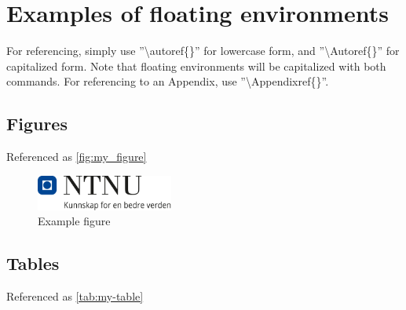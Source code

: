 
\section{Examples of floating environments}
\label{appendix:floats}

For referencing, simply use ''\textbackslash autoref\{\}'' for lowercase form, and ''\textbackslash Autoref\{\}'' for capitalized form. Note that floating environments will be capitalized with both commands.
For referencing to an Appendix, use ''\textbackslash Appendixref\{\}''.


\subsection{Figures}
\label{sec:figures}

Referenced as \autoref{fig:my_figure}
\begin{figure}[h!]
    \centering
    \includegraphics[width=0.4\textwidth]{Images/ntnu.png}
    \caption{Example figure}
    \label{fig:my_figure}
\end{figure}


\subsection{Tables}
Referenced as \autoref{tab:my-table}

